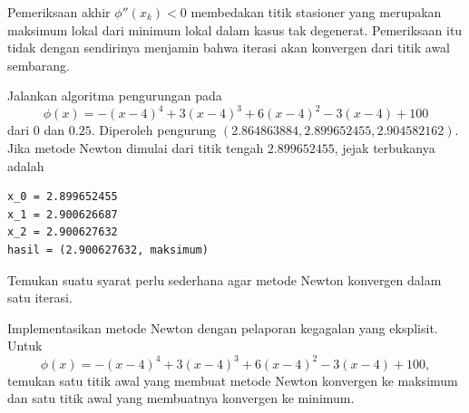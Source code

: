 \begin{algorithm}
\caption{Metode Newton Satu Dimensi}
\label{alg:NewtonsMethod1}
\noindent{}
\end{algorithm}

\begin{remark} Pemeriksaan akhir $\phi''(x_k)<0$ membedakan titik stasioner yang merupakan maksimum lokal dari minimum lokal dalam kasus tak degenerat. Pemeriksaan itu tidak dengan sendirinya menjamin bahwa iterasi akan konvergen dari titik awal sembarang.
\end{remark}

\begin{example} Jalankan algoritma pengurungan pada
\begin{displaymath}
\phi(x)=-(x-4)^4+3(x-4)^3+6(x-4)^2-3(x-4)+100
\end{displaymath}
dari $0$ dan $0.25$. Diperoleh pengurung $(2.864863884,2.899652455,2.904582162)$. Jika metode Newton dimulai dari titik tengah $2.899652455$, jejak terbukanya adalah
\begin{verbatim}
x_0 = 2.899652455
x_1 = 2.900626687
x_2 = 2.900627632
hasil = (2.900627632, maksimum)
\end{verbatim}
\end{example}

\begin{exercise} Temukan suatu syarat perlu sederhana agar metode Newton konvergen dalam satu iterasi.
\end{exercise}

\begin{exercise} Implementasikan metode Newton dengan pelaporan kegagalan yang eksplisit. Untuk
\begin{displaymath}
\phi(x)=-(x-4)^4+3(x-4)^3+6(x-4)^2-3(x-4)+100,
\end{displaymath}
temukan satu titik awal yang membuat metode Newton konvergen ke maksimum dan satu titik awal yang membuatnya konvergen ke minimum.
\end{exercise}


